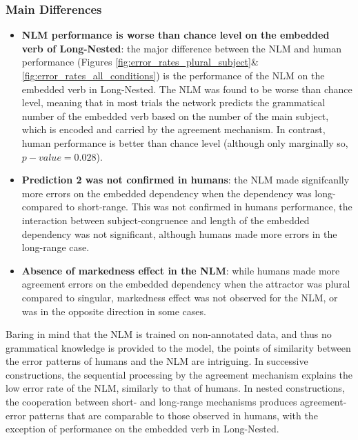 \subsubsection{Main Differences}
    \begin{itemize}
        \item \textbf{NLM performance is worse than chance level on the embedded verb of Long-Nested}: the major difference between the NLM and human performance (Figures \ref{fig:error_rates_plural_subject}\&\ref{fig:error_rates_all_conditions}) is the performance of the NLM on the embedded verb in Long-Nested. The NLM was found to be worse than chance level, meaning that in most trials the network predicts the grammatical number of the embedded verb based on the number of the main subject, which is encoded and carried by the agreement mechanism. In contrast, human performance is better than chance level (although only marginally so, $p-value = 0.028$).
        \item \textbf{Prediction 2 was not confirmed in humans}: the NLM made signifcanlly more errors on the embedded dependency when the dependency was long- compared to short-range. This was not confirmed in humans performance, the interaction between subject-congruence and length of the embedded dependency was not significant, although humans made more errors in the long-range case.
        \item \textbf{Absence of markedness effect in the NLM}: while humans made more agreement errors on the embedded dependency when the attractor was plural compared to singular, markedness effect was not observed for the NLM, or was in the opposite direction in some cases. 
    \end{itemize}
    

Baring in mind that the NLM is trained on non-annotated data, and thus no grammatical knowledge is provided to the model, the points of similarity between the error patterns of humans and the NLM are intriguing. In successive constructions, the sequential processing by the agreement mechanism explains the low error rate of the NLM, similarly to that of humans. In nested constructions, the cooperation between short- and long-range mechanisms produces agreement-error patterns that are comparable to those observed in humans, with the exception of performance on the embedded verb in Long-Nested. 


